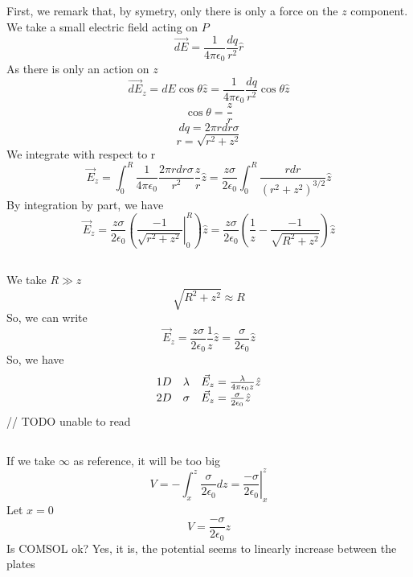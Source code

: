 \documentclass{article}
\begin{document}
\subsection{}
First, we remark that, by symetry, only there is only a force on the \(z\)
component.
We take a small electric field acting on \(P\)
\[
	\vec{dE} = \frac{1}{4 \pi \epsilon_0} \frac{dq}{r^2} \hat{r}
\]
As there is only an action on \(z\)
\[
	\vec{dE}_z = dE \cos{\theta} \hat{z}
	= \frac{1}{4 \pi \epsilon_0} \frac{dq}{r^2} \cos{\theta} \hat{z}
\]
\[
	\cos{\theta} = \frac{z}{r}
\]
\[
	dq = 2 \pi r dr \sigma
\]
\[
	r = \sqrt{r^2+z^2}
\]
We integrate with respect to r
\[
	\vec{E}_z = \int_0^R \frac{1}{4 \pi \epsilon_0}
		\frac{2 \pi r dr \sigma}{r^2} \frac{z}{r} \hat{z}
	= \frac{z \sigma}{2 \epsilon_0}
	\int_0^R \frac{r dr}{(r^2 + z^2)^{3/2}} \hat{z}
\]
By integration by part, we have
\[
	\vec{E}_z = \frac{z \sigma}{2 \epsilon_0}
	( \left. \frac{-1}{\sqrt{r^2+z^2}} \right |_0^R ) \hat{z}
	= \frac{z \sigma}{2 \epsilon_0}
		( \frac{1}{z} - \frac{-1}{\sqrt{R^2+z^2}} ) \hat{z}
\]

\subsection{}

We take \(R \gg z\)
\[
	\sqrt{R^2 + z^2} \approx R
\]
So, we can write
\[
	\vec{E}_z = \frac{z \sigma}{2 \epsilon_0} \frac{1}{z} \hat{z}
	= \frac{\sigma}{2 \epsilon_0} \hat{z}
\]
So, we have
\[
	\begin{array}{l l l}
		1D & \lambda &
		\vec{E}_z = \frac{\lambda}{4 \pi \epsilon_0 z} \hat{z} \\
		2D & \sigma  &
		\vec{E}_z = \frac{\sigma}{2 \epsilon_0} \hat{z}
	\end{array}
\]
// TODO unable to read

\subsection{}

If we take \(\infty\) as reference, it will be too big
\[
	V = - \int_{x}^z \frac{\sigma}{2 \epsilon_0} dz
	= \left. \frac{- \sigma}{2 \epsilon_0} \right|_x^z
\]
Let \(x = 0\)
\[
	V = \frac{- \sigma}{2 \epsilon_0} z
\]
Is COMSOL ok? Yes, it is, the potential seems to linearly increase between the
plates

\subsection{}
\end{document}
